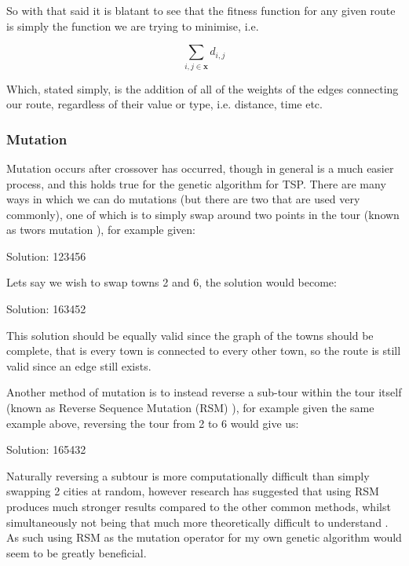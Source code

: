 \documentclass[11pt,a4paper,titlepage]{article}
\begin{document}
So with that said it is blatant to see that the fitness function for any given route is simply the function we are trying to minimise, i.e.

\[\sum_{i,j \in \mathbf{x}} d_{i,j}\]

Which, stated simply, is the addition of all of the weights of the edges connecting our route, regardless of their value or type, i.e. distance, time etc.

\subsubsection{Mutation}

Mutation occurs after crossover has occurred, though in general is a much easier process, and this holds true for the genetic algorithm for TSP. There are many ways in which we can do mutations (but there are two that are used very commonly), one of which is to simply swap around two points in the tour (known as twors mutation \cite{GAMutations}), for example given:

\begin{center}\Large
Solution: 123456
\end{center}

Lets say we wish to swap towns 2 and 6, the solution would become:

\begin{center}\Large
Solution: 163452
\end{center}

This solution should be equally valid since the graph of the towns should be complete, that is every town is connected to every other town, so the route is still valid since an edge still exists.

Another method of mutation is to instead reverse a sub-tour within the tour itself (known as Reverse Sequence Mutation (RSM) \cite{GAMutations}), for example given the same example above, reversing the tour from 2 to 6 would give us:
 
\begin{center}\Large
Solution: 165432
\end{center}

Naturally reversing a subtour is more computationally difficult than simply swapping 2 cities at random, however research has suggested that using RSM produces much stronger results compared to the other common methods, whilst simultaneously not being that much more theoretically difficult to understand \cite{GAMutations}. As such using RSM as the mutation operator for my own genetic algorithm would seem to be greatly beneficial.
\end{document}
